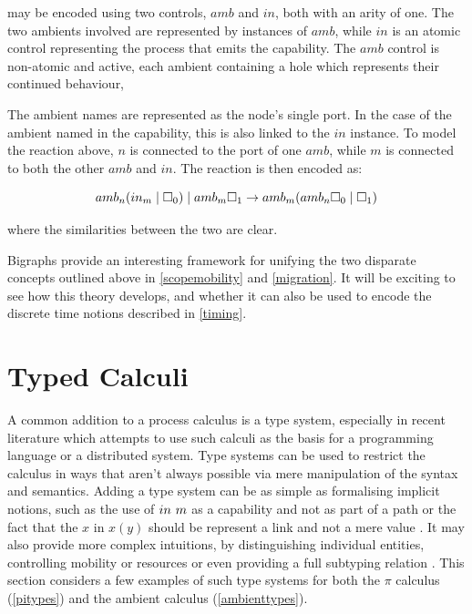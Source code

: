 \noindent may be encoded using two controls, $amb$ and $in$, both with
an arity of one.  The two ambients involved are represented by
instances of $amb$, while $in$ is an atomic control representing the
process that emits the capability.  The $amb$ control is non-atomic
and active, each ambient containing a hole which represents their
continued behaviour,

The ambient names are represented as the node's single port.  In the
case of the ambient named in the capability, this is also linked to the
$in$ instance.  To model the reaction above, $n$ is connected to the
port of one $amb$, while $m$ is connected to both the other $amb$ and
$in$.  The reaction is then encoded as:

\begin{equation}
amb_n (in_m \;|\; \square_0) \;|\; amb_m \square_1
\rightarrow
amb_m (amb_n \square_0 \;|\; \square_1)
\end{equation}

\noindent where the similarities between the two are clear.

Bigraphs provide an interesting framework for unifying the two disparate
concepts outlined above in \ref{scopemobility} and \ref{migration}.  It
will be exciting to see how this theory develops, and whether it can
also be used to encode the discrete time notions described in \ref{timing}.

\section{Typed Calculi}
\label{typedcalculi}

A common addition to a process calculus is a type system, especially
in recent literature which attempts to use such calculi as the basis
for a programming language or a distributed system.  Type systems can
be used to restrict the calculus in ways that aren't always possible
via mere manipulation of the syntax and semantics.  Adding a type
system can be as simple as formalising implicit notions, such as the
use of $in\ m$ as a capability and not as part of a path
\cite{ambienttypes} or the fact that the $x$ in $x(y)$ should be
represent a link and not a mere value \cite{sangiorgi:types-or}.  It
may also provide more complex intuitions, by distinguishing individual
entities, controlling mobility \cite{sangiorgi:mobsafeambients,
  ambienttypes} or resources \cite{hennessy:dpi98} or even providing a
full subtyping relation \cite{sangiorgi:typing, boxedamb02}.  This
section considers a few examples of such type systems for both the
$\pi$ calculus (\ref{pitypes}) and the ambient calculus
(\ref{ambienttypes}).

